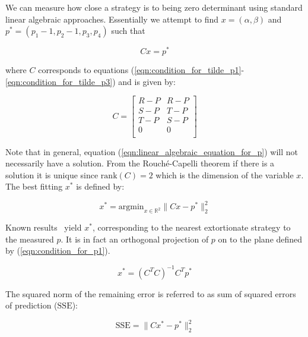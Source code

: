 \documentclass[a4paper]{article}
\newcommand{\SSe}{\text{SSE}}
\begin{document}
We can measure how close a strategy is to being zero determinant using standard
linear algebraic approaches. Essentially we attempt to find \(x=(\alpha,
\beta)\) and \(p^*=(p_1 - 1, p_2 - 1, p_3, p_4)\)
such that

\begin{equation}\label{eqn:linear_algebraic_equation_for_p}
    Cx= p^*
\end{equation}

where \(C\) corresponds to equations
(\ref{eqn:condition_for_tilde_p1}-\ref{eqn:condition_for_tilde_p3}) and is
given by:

\begin{equation}\label{eqn:definition_of_C}
    C =
    \begin{bmatrix}
        R - P & R- P \\
        S - P & T- P \\
        T - P & S- P \\
        0     & 0 \\
    \end{bmatrix}
\end{equation}

Note that in general, equation (\ref{eqn:linear_algebraic_equation_for_p}) will
not necessarily have a solution. From the Rouch\'{e}-Capelli theorem if there is
a solution it is unique since \(\text{rank}(C)=2\) which is the dimension of the
variable \(x\). The best fitting \(x^*\) is defined by:

\begin{equation}\label{eqn:x_star}
    x^* = \text{argmin}_{x\in\mathbb{R}^2}\|C x- p^*\|_2^2
\end{equation}

Known results~\cite{kutner2004applied, rao1973linear, wakefield2013bayesian} yield
$x^*$, corresponding to the nearest extortionate strategy to the
measured \(p\). It is in fact an orthogonal projection of \(p\) on to the plane
defined by (\ref{eqn:condition_for_p1}).

\begin{equation}\label{eqn:x_star_formula}
    x^* = {\left(C^{T}C\right)}^{-1}C^{T}p^{*}
\end{equation}

The squared norm of the remaining error is referred to as sum of squared errors
of prediction (\(\SSe\)):

\begin{equation}\label{eqn:r_squared}
    \SSe = \|C x^*- p^*\|_2^2
\end{equation}
\end{document}
